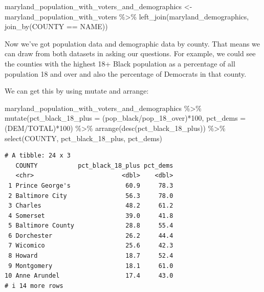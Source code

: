\documentclass[
  letterpaper,
  DIV=11,
  numbers=noendperiod]{scrreprt}
\newenvironment{Shaded}{\begin{snugshade}}{\end{snugshade}}
\newcommand{\AttributeTok}[1]{\textcolor[rgb]{0.40,0.45,0.13}{#1}}
\newcommand{\DecValTok}[1]{\textcolor[rgb]{0.68,0.00,0.00}{#1}}
\newcommand{\FunctionTok}[1]{\textcolor[rgb]{0.28,0.35,0.67}{#1}}
\newcommand{\NormalTok}[1]{\textcolor[rgb]{0.00,0.23,0.31}{#1}}
\newcommand{\OtherTok}[1]{\textcolor[rgb]{0.00,0.23,0.31}{#1}}
\newcommand{\SpecialCharTok}[1]{\textcolor[rgb]{0.37,0.37,0.37}{#1}}
\begin{document}
\begin{Shaded}
\begin{Highlighting}[]
\NormalTok{maryland\_population\_with\_voters\_and\_demographics }\OtherTok{\textless{}{-}}\NormalTok{ maryland\_population\_with\_voters }\SpecialCharTok{\%\textgreater{}\%} \FunctionTok{left\_join}\NormalTok{(maryland\_demographics, }\FunctionTok{join\_by}\NormalTok{(COUNTY }\SpecialCharTok{==}\NormalTok{ NAME))}
\end{Highlighting}
\end{Shaded}

Now we've got population data and demographic data by county. That means
we can draw from both datasets in asking our questions. For example, we
could see the counties with the highest 18+ Black population as a
percentage of all population 18 and over and also the percentage of
Democrats in that county.

We can get this by using mutate and arrange:

\begin{Shaded}
\begin{Highlighting}[]
\NormalTok{maryland\_population\_with\_voters\_and\_demographics }\SpecialCharTok{\%\textgreater{}\%}
  \FunctionTok{mutate}\NormalTok{(}\AttributeTok{pct\_black\_18\_plus =}\NormalTok{ (pop\_black}\SpecialCharTok{/}\NormalTok{pop\_18\_over)}\SpecialCharTok{*}\DecValTok{100}\NormalTok{, }\AttributeTok{pct\_dems =}\NormalTok{ (DEM}\SpecialCharTok{/}\NormalTok{TOTAL)}\SpecialCharTok{*}\DecValTok{100}\NormalTok{) }\SpecialCharTok{\%\textgreater{}\%}
  \FunctionTok{arrange}\NormalTok{(}\FunctionTok{desc}\NormalTok{(pct\_black\_18\_plus)) }\SpecialCharTok{\%\textgreater{}\%}
  \FunctionTok{select}\NormalTok{(COUNTY, pct\_black\_18\_plus, pct\_dems)}
\end{Highlighting}
\end{Shaded}

\begin{verbatim}
# A tibble: 24 x 3
   COUNTY           pct_black_18_plus pct_dems
   <chr>                        <dbl>    <dbl>
 1 Prince George's               60.9     78.3
 2 Baltimore City                56.3     78.0
 3 Charles                       48.2     61.2
 4 Somerset                      39.0     41.8
 5 Baltimore County              28.8     55.4
 6 Dorchester                    26.2     44.4
 7 Wicomico                      25.6     42.3
 8 Howard                        18.7     52.4
 9 Montgomery                    18.1     61.0
10 Anne Arundel                  17.4     43.0
# i 14 more rows
\end{verbatim}
\end{document}
